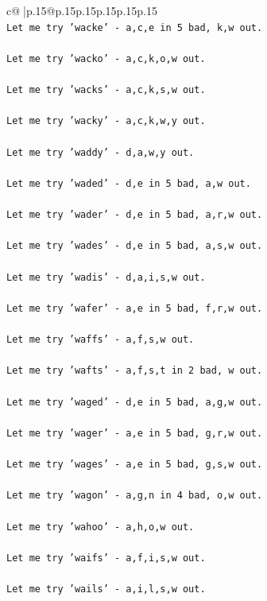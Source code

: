 \documentclass{article}
\begin{document}
{\begin{supertabular}{c@{$\;$}|p{.15\linewidth}@{}p{.15\linewidth}p{.15\linewidth}p{.15\linewidth}p{.15\linewidth}p{.15\linewidth}}
{{{\\ 
\texttt{Let me try 'wacke' {-} a,c,e in 5 bad, k,w out. } \\
\\ 
\texttt{Let me try 'wacko' {-} a,c,k,o,w out. } \\
\\ 
\texttt{Let me try 'wacks' {-} a,c,k,s,w out. } \\
\\ 
\texttt{Let me try 'wacky' {-} a,c,k,w,y out. } \\
\\ 
\texttt{Let me try 'waddy' {-} d,a,w,y out. } \\
\\ 
\texttt{Let me try 'waded' {-} d,e in 5 bad, a,w out. } \\
\\ 
\texttt{Let me try 'wader' {-} d,e in 5 bad, a,r,w out. } \\
\\ 
\texttt{Let me try 'wades' {-} d,e in 5 bad, a,s,w out. } \\
\\ 
\texttt{Let me try 'wadis' {-} d,a,i,s,w out. } \\
\\ 
\texttt{Let me try 'wafer' {-} a,e in 5 bad, f,r,w out. } \\
\\ 
\texttt{Let me try 'waffs' {-} a,f,s,w out. } \\
\\ 
\texttt{Let me try 'wafts' {-} a,f,s,t in 2 bad, w out. } \\
\\ 
\texttt{Let me try 'waged' {-} d,e in 5 bad, a,g,w out. } \\
\\ 
\texttt{Let me try 'wager' {-} a,e in 5 bad, g,r,w out. } \\
\\ 
\texttt{Let me try 'wages' {-} a,e in 5 bad, g,s,w out. } \\
\\ 
\texttt{Let me try 'wagon' {-} a,g,n in 4 bad, o,w out. } \\
\\ 
\texttt{Let me try 'wahoo' {-} a,h,o,w out. } \\
\\ 
\texttt{Let me try 'waifs' {-} a,f,i,s,w out. } \\
\\ 
\texttt{Let me try 'wails' {-} a,i,l,s,w out. } \\
}}}
\end{supertabular}}
\end{document}
